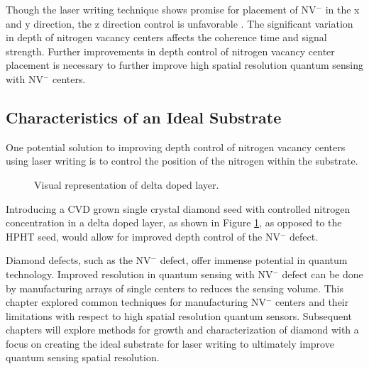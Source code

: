 Though the laser writing technique shows promise for placement of NV$^-$ in the x and y direction, the z direction control is unfavorable \cite{Chen2019}. The significant variation in depth of nitrogen vacancy centers affects the coherence time and signal strength. Further improvements in depth control of nitrogen vacancy center placement is necessary to further improve high spatial resolution quantum sensing with NV$^-$ centers.
    
\subsection{Characteristics of an Ideal Substrate}
\label{idealSubstrate}
\indent 

One potential solution to improving depth control of nitrogen vacancy centers using laser writing is to control the position of the nitrogen within the substrate. 

    \begin{figure}[h!]
    \centering
    \caption{Visual representation of delta doped layer.}
    \label{fig:deltadopedlayer}
    \end{figure}

Introducing a CVD grown single crystal diamond seed with controlled nitrogen concentration in a delta doped layer, as shown in Figure \ref{fig:deltadopedlayer}, as opposed to the HPHT seed, would allow for improved depth control of the NV$^-$ defect. 

Diamond defects, such as the NV$^-$ defect, offer immense potential in quantum technology. Improved resolution in quantum sensing with NV$^-$ defect can be done by manufacturing arrays of single centers to reduces the sensing volume. This chapter explored common techniques for manufacturing NV$^-$ centers and their limitations with respect to high spatial resolution quantum sensors. Subsequent chapters will explore methods for growth and characterization of diamond with a focus on creating the ideal substrate for laser writing to ultimately improve quantum sensing spatial resolution. 
